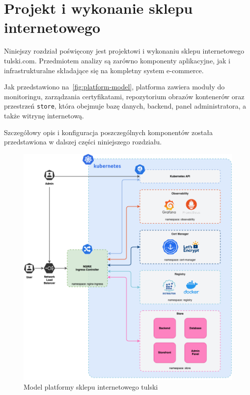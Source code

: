 \newpage


\section{Projekt i wykonanie sklepu internetowego}\label{sec:projekt-platformy}

Niniejszy rozdział poświęcony jest projektowi i wykonaniu sklepu internetowego tulski.com.
Przedmiotem analizy są zarówno komponenty aplikacyjne, jak i infrastrukturalne składające się na kompletny system e-commerce.

Jak przedstawiono na~\autoref{fig:platform-model}, platforma zawiera moduły do monitoringu, zarządzania certyfikatami, repozytorium obrazów kontenerów oraz przestrzeń \texttt{store}, która obejmuje bazę danych, backend, panel administratora, a także witrynę internetową.

Szczegółowy opis i konfiguracja poszczególnych komponentów została przedstawiona w dalszej części niniejszego rozdziału.

\begin{figure}[p]
    \centering
    \includegraphics[width=\textwidth]{img/main-infra-model}
    \caption{Model platformy sklepu internetowego tulski}
    \label{fig:platform-model}
\end{figure}

